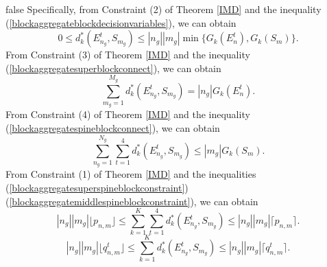 \documentclass[letterpaper,twocolumn,10pt]{article}
\begin{document}
\if false
Specifically, from Constraint (2) of Theorem \ref{IMD} and the inequality (\ref{blockaggregateblockdecisionvariables}), we can obtain
\begin{equation}\label{blockaggregateblockdecisionvariables1}
0\leq d^*_{k}(E_{n_g}^t, S_{m_g})\leq |n_g||m_g|\min\{G_k(E_n^t), G_k(S_m)\}.
\end{equation}
From Constraint (3) of Theorem \ref{IMD} and the inequality (\ref{blockaggregatesuperblockconnect}), we can obtain
\begin{equation}\label{blockaggregatesuperblockconnect1}
\sum_{m_g=1}^{M_g}d^*_{k}(E_{n_g}^t, S_{m_g}) = |n_g|G_k(E_n^t).
\end{equation}
From Constraint (4) of Theorem \ref{IMD} and the inequality (\ref{blockaggregatespineblockconnect}), we can obtain
\begin{equation}\label{blockaggregatespineblockconnect1}
\sum_{n_g=1}^{N_g}\sum_{t=1}^4d^*_{k}(E_{n_g}^t, S_{m_g}) \leq |m_g|G_k(S_m).
\end{equation}
From Constraint (1) of Theorem \ref{IMD} and the inequalities (\ref{blockaggregatesuperspineblockconstraint})(\ref{blockaggregatemiddlespineblockconstraint}), we can obtain
\begin{equation}\label{blockaggregatesuperspineblockconstraint1}
|n_g||m_g|\lfloor p_{n,m}\rfloor\leq \sum_{k=1}^{K}\sum_{t=1}^4 d^*_{k}(E_{n_g}^t, S_{m_g})\leq |n_g||m_g|\lceil p_{n,m}\rceil.
\end{equation}
\begin{equation}\label{blockaggregatemiddlespineblockconstraint1}
|n_g||m_g|\lfloor q^t_{n,m}\rfloor\leq \sum_{k=1}^{K}d^*_{k}(E_{n_g}^t, S_{m_g})\leq |n_g||m_g|\lceil q^t_{n,m}\rceil.
\end{equation}
\fi
\end{document}
